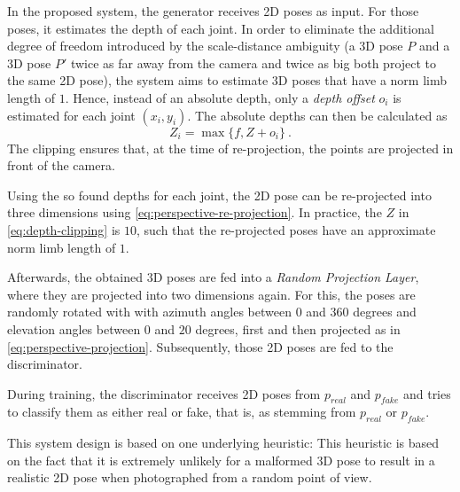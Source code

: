 In the proposed system, the generator receives 2D poses as input.
For those poses, it estimates the depth of each joint.
In order to eliminate the additional degree of freedom introduced by the scale-distance ambiguity (a 3D pose $P$ and a 3D pose $P'$ twice as far away from the camera and twice as big both project to the same 2D pose), the system aims to estimate 3D poses that have a norm limb length of $1$.
Hence, instead of an absolute depth, only a \emph{depth offset} $o_i$ is estimated for each joint $(x_i, y_i)$.
The absolute depths can then be calculated as
\begin{equation}
	\label{eq:depth-clipping}
	Z_i = \max \{f, Z + o_i\} \ .
\end{equation}
The clipping ensures that, at the time of re-projection, the points are projected in front of the camera.

Using the so found depths for each joint, the 2D pose can be re-projected into three dimensions using \autoref{eq:perspective-re-projection}.
In practice, the $Z$ in \autoref{eq:depth-clipping} is $10$, such that the re-projected poses have an approximate norm limb length of $1$.

Afterwards, the obtained 3D poses are fed into a \emph{Random Projection Layer}, where they are projected into two dimensions again.
For this, the poses are randomly rotated with with azimuth angles between $0$ and $360$ degrees and elevation angles between $0$ and $20$ degrees, first and then projected as in \autoref{eq:perspective-projection}.
Subsequently, those 2D poses are fed to the discriminator.

During training, the discriminator receives 2D poses from $p_{real}$ and $p_{fake}$ and tries to classify them as either real or fake, that is, as stemming from $p_{real}$ or $p_{fake}$.

This system design is based on one underlying heuristic:\vspace{.5em}\newline
\vspace{.5em}
\newline
This heuristic is based on the fact that it is extremely unlikely for a malformed 3D pose to result in a realistic 2D pose when photographed from a random point of view.



